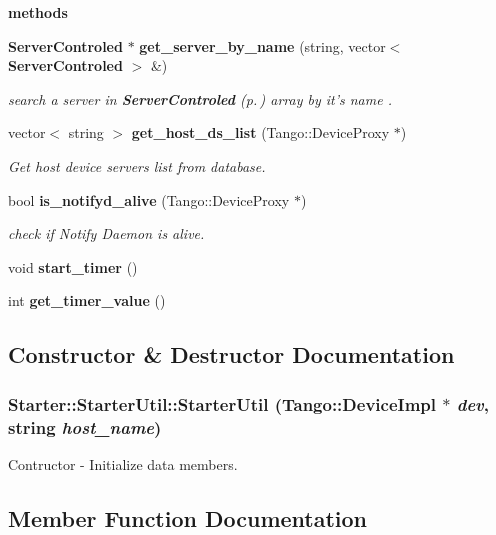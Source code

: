 \begin{Indent}{\bf methods}
\begin{CompactItemize}
{\bf Server\-Controled} $\ast$ {\bf get\_\-server\_\-by\_\-name} (string, vector$<$ {\bf Server\-Controled} $>$ \&)
\begin{CompactList}\small\item\em search a server in {\bf Server\-Controled} {\rm (p.\,\pageref{structStarter_1_1ServerControled})} array by it's name .\item\end{CompactList}\item 
vector$<$ string $>$ {\bf get\_\-host\_\-ds\_\-list} (Tango::Device\-Proxy $\ast$)
\begin{CompactList}\small\item\em Get host device servers list from database.\item\end{CompactList}\item 
bool {\bf is\_\-notifyd\_\-alive} (Tango::Device\-Proxy $\ast$)
\begin{CompactList}\small\item\em check if Notify Daemon is alive.\item\end{CompactList}\item 
void {\bf start\_\-timer} ()
\item 
int {\bf get\_\-timer\_\-value} ()
\end{CompactItemize}
\end{Indent}


\subsection{Constructor \& Destructor Documentation}
\subsubsection{\setlength{\rightskip}{0pt plus 5cm}Starter::Starter\-Util::Starter\-Util (Tango::Device\-Impl $\ast$ {\em dev}, string {\em host\_\-name})}\label{classStarter_1_1StarterUtil_z7_0}


Contructor - Initialize data members.



\subsection{Member Function Documentation}

